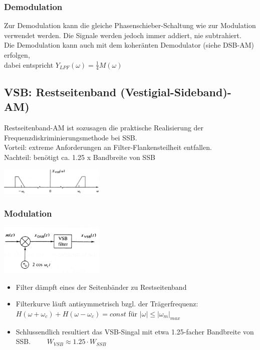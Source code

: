 \subsubsection{Demodulation}
Zur Demodulation kann die gleiche Phasenschieber-Schaltung wie zur Modulation verwendet
werden. Die Signale werden jedoch immer addiert, nie subtrahiert. \\
Die Demodulation kann auch mit dem koheränten Demodulator (siehe DSB-AM) erfolgen,\\
 dabei entspricht $Y_{LPF}(\omega) = \frac{1}{4}M(\omega)$ \\


\subsection{VSB: Restseitenband (Vestigial-Sideband)-AM)}
	\begin{minipage}{12cm}
		Restseitenband-AM ist sozusagen die praktische Realisierung der Frequenzdiskriminierungsmethode bei
		SSB. \\
		Vorteil: extreme Anforderungen an Filter-Flankensteilheit entfallen.\\
		Nachteil: ben\"otigt ca. 1.25 x Bandbreite von SSB
	\end{minipage}
	\begin{minipage}{5cm}
		\begin{center}
		    \includegraphics[width=5cm]{bilder/am_vsb_spektrum.png}
		\end{center}
	\end{minipage}
	
	\subsubsection{Modulation}
		\begin{minipage}[t][2.2cm][c]{5.5cm}
    		\includegraphics[width=5cm]{bilder/am_vsb_modulator.png}
		\end{minipage}
		\begin{minipage}[t][2.2cm][c]{12.5cm}	
			\begin{itemize}
				\item Filter d\"ampft eines der Seitenbänder zu Restseitenband
				\item Filterkurve läuft antisymmetrisch bzgl. der Trägerfrequenz: \\
				$H(\omega +
				\omega_c) + H(\omega - \omega_c) = const$ für $|\omega| \leq |\omega_m|_{max}$
				\item Schlussendlich resultiert das VSB-Singal  mit etwa 1.25-facher Bandbreite von SSB. $ \qquad  W_{VSB} \approx 1.25 \cdot W_{SSB} $
			\end{itemize}
		\end{minipage}


